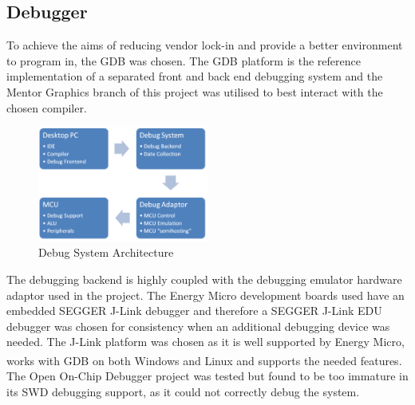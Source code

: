 \subsection{Debugger}
To achieve the aims of reducing vendor lock-in and provide a better environment to program in, the
\ac{GDB} was chosen. The \ac{GDB} platform is the reference implementation of a
separated front and back end debugging system and the Mentor Graphics branch of this project was
utilised to best interact with the chosen compiler.

\begin{figure}
  \vspace{-10pt}
  \begin{center}
    \includegraphics[width=0.5\textwidth, keepaspectratio=true]{images/debug_system.png}
  \end{center}
  \caption[Debug System Architecture]{Debug System Architecture}
  \vspace{-10pt}
\end{figure}

The debugging backend is highly coupled with the debugging emulator hardware adaptor used in the
project. The Energy Micro development boards used have an embedded SEGGER J-Link debugger
and therefore a SEGGER J-Link EDU debugger was chosen for consistency when an additional
debugging device was needed. The J-Link platform was chosen as it is well supported by Energy
Micro, works with \ac{GDB} on both Windows\textsuperscript{\textregistered} and Linux and supports
the needed features. The Open On-Chip Debugger project was tested but
found to be too immature in its \ac{SWD} debugging support, as it could not correctly
debug the system.


